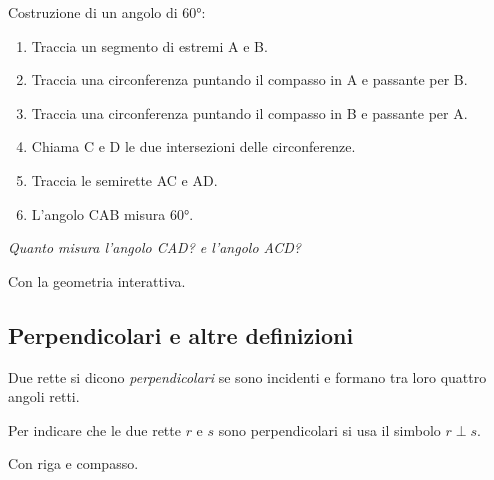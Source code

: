 \begin{procedura}[Angolo di 60°]\label{proc:fonda_ang_60}
  Costruzione di un angolo di 60°:
  \begin{enumerate} [nosep]
    \item 
    Traccia un segmento di estremi A e B.  
    \item 
    Traccia una circonferenza puntando il compasso in A e passante per B.  
    \item 
    Traccia una circonferenza puntando il compasso in B e passante per A.  
    \item 
    Chiama C e D le due intersezioni delle circonferenze.
    \item
    Traccia le semirette AC e AD.
    \item
    L'angolo CAB misura 60°.
  \end{enumerate}
\end{procedura}
\textsl{Quanto misura l'angolo CAD? e l'angolo ACD?}

\ifcoding
Con la geometria interattiva.


\fi

\subsection{Perpendicolari e altre definizioni}

\begin{definizione}
Due rette si dicono \emph{perpendicolari} se sono incidenti e formano 
tra loro quattro angoli retti.
\end{definizione}

\begin{inaccessibleblock}
\begin{center}\end{center}
\end{inaccessibleblock}

Per indicare che le due rette \(r\) e \(s\) sono perpendicolari si usa il 
simbolo \(r\perp s\).

Con riga e compasso.

